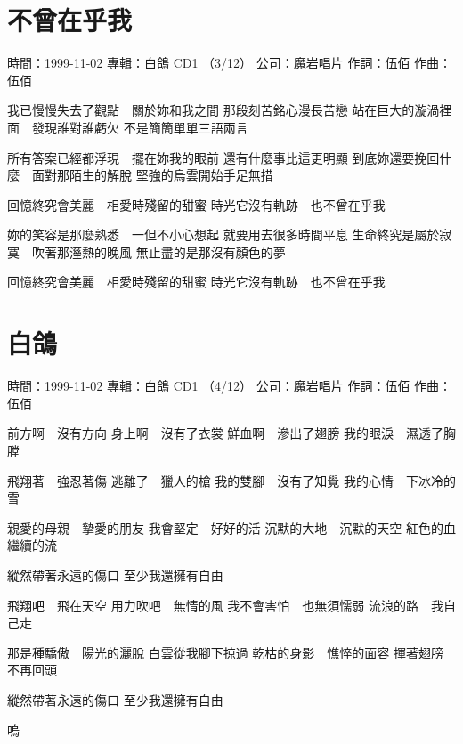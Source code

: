\documentclass[UTF8,a4paper,oneside,twocolumn,12pt]{ctexbook}
\newcommand{\infopair}[2]{\textbullet #1：#2}
\newcommand{\zc}[1][伍佰]{\infopair{作詞}{#1}}
\newcommand{\zq}[1][伍佰]{\infopair{作曲}{#1}}
\newcommand{\zj}[1]{\infopair{專輯}{#1}}
\newcommand{\sj}[1]{\infopair{時間}{#1}}
\newcommand{\gs}[1]{\infopair{公司}{#1}}
\newenvironment{info}{\begin{flushleft}\kaishu
	}
	{\end{flushleft}\normalsize\yahei\par}
\newenvironment{lyric}{
	}
{}
\begin{document}
\section{不曾在乎我}
\begin{info}
	\sj{1999-11-02}
	\zj{白鴿 CD1 （3/12）}
	\gs{魔岩唱片}
	\zc
	\zq
\end{info}
\begin{lyric}
	我已慢慢失去了觀點　關於妳和我之間
	那段刻苦銘心漫長苦戀
	站在巨大的漩渦裡面　發現誰對誰虧欠
	不是簡簡單單三語兩言

	所有答案已經都浮現　擺在妳我的眼前
	還有什麼事比這更明顯
	到底妳還要挽回什麼　面對那陌生的解脫
	堅強的烏雲開始手足無措

	回憶終究會美麗　相愛時殘留的甜蜜
	時光它沒有軌跡　也不曾在乎我

	妳的笑容是那麼熟悉　一但不小心想起
	就要用去很多時間平息
	生命終究是屬於寂寞　吹著那溼熱的晚風
	無止盡的是那沒有顏色的夢

	回憶終究會美麗　相愛時殘留的甜蜜
	時光它沒有軌跡　也不曾在乎我
\end{lyric}

\section{白鴿}
\begin{info}
	\sj{1999-11-02}
	\zj{白鴿 CD1 （4/12）}
	\gs{魔岩唱片}
	\zc
	\zq
\end{info}
\begin{lyric}
	前方啊　沒有方向
	身上啊　沒有了衣裳
	鮮血啊　滲出了翅膀
	我的眼淚　濕透了胸膛

	飛翔著　強忍著傷
	逃離了　獵人的槍
	我的雙腳　沒有了知覺
	我的心情　下冰冷的雪

	親愛的母親　摯愛的朋友
	我會堅定　好好的活
	沉默的大地　沉默的天空
	紅色的血　繼續的流

	縱然帶著永遠的傷口
	至少我還擁有自由

	飛翔吧　飛在天空
	用力吹吧　無情的風
	我不會害怕　也無須懦弱
	流浪的路　我自己走

	那是種驕傲　陽光的灑脫
	白雲從我腳下掠過
	乾枯的身影　憔悴的面容
	揮著翅膀　不再回頭

	縱然帶著永遠的傷口
	至少我還擁有自由

	嗚————
\end{lyric}
\end{document}
